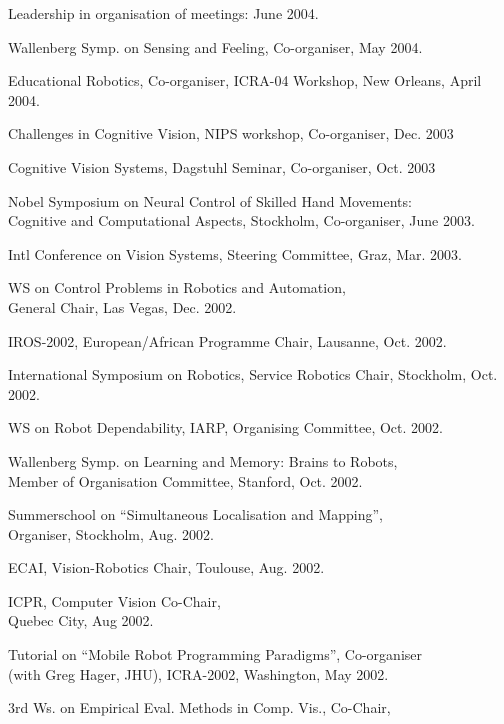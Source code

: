 \documentclass{article}
\begin{document}
\begin{cv}
\begin{cvlist}{Leadership in organisation of meetings:}
  \cftdotfill{\cftdotsep} June 2004.
\item Wallenberg Symp. on Sensing and Feeling, Co-organiser,
  \cftdotfill{\cftdotsep} May 2004.
\item Educational Robotics, Co-organiser, ICRA-04 Workshop, New
  Orleans, \cftdotfill{\cftdotsep} April 2004.
\item Challenges in Cognitive Vision, NIPS workshop, Co-organiser,
  \cftdotfill{\cftdotsep} Dec. 2003
\item Cognitive Vision Systems, Dagstuhl Seminar, Co-organiser,
  \cftdotfill{\cftdotsep} Oct. 2003
\item Nobel Symposium on Neural Control of Skilled Hand
  Movements:\\ Cognitive and Computational Aspects, Stockholm,
  Co-organiser, \cftdotfill{\cftdotsep} June 2003.
\item Intl Conference on Vision Systems, Steering Committee, Graz,
  \cftdotfill{\cftdotsep} Mar. 2003.
\item WS on Control Problems in Robotics and Automation, \\General
  Chair, Las Vegas, \cftdotfill{\cftdotsep}Dec. 2002.
\item IROS-2002, European/African Programme Chair, Lausanne,
  \cftdotfill{\cftdotsep} Oct. 2002.
\item International Symposium on Robotics, Service Robotics Chair,
  Stockholm, \cftdotfill{\cftdotsep} Oct. 2002.
\item WS on Robot Dependability, IARP, Organising Committee,
  \cftdotfill{\cftdotsep} Oct. 2002.
\item Wallenberg Symp. on Learning and Memory: Brains to Robots,\\
  Member of Organisation Committee, Stanford, \cftdotfill{\cftdotsep} Oct. 2002.
\item Summerschool on ``Simultaneous Localisation and Mapping'',
  \\Organiser, Stockholm, \cftdotfill{\cftdotsep}Aug. 2002.
\item ECAI, Vision-Robotics Chair, Toulouse, \cftdotfill{\cftdotsep}
  Aug. 2002.
\item ICPR, Computer Vision Co-Chair,\\ Quebec City,
  \cftdotfill{\cftdotsep} Aug 2002.
\item Tutorial on ``Mobile Robot Programming Paradigms'',
  Co-organiser\\ (with Greg Hager, JHU), ICRA-2002, Washington,
  \cftdotfill{\cftdotsep}May 2002.
\item 3rd Ws. on Empirical Eval. Methods in Comp. Vis., Co-Chair,

\end{cvlist}
\end{cv}
\end{document}
